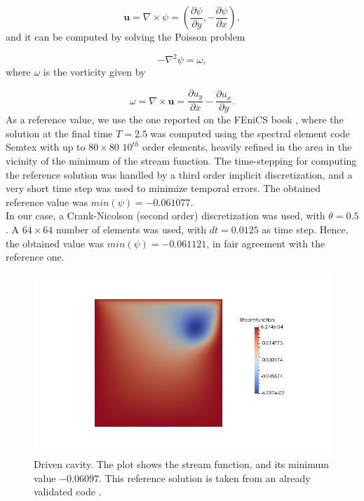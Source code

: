 \documentclass[a4paper,11pt,oneside]{book}
\begin{document}
\[
\mathbf{u} = \nabla \times \psi = (\frac{\partial \psi}{\partial y} , - \frac{\partial \psi }{\partial x}),
\]
and it can be computed by solving the Poisson problem

\[
- \nabla^2 \psi = \omega,
\]
where $\omega$ is the vorticity given by

\[
\omega = \nabla \times \mathbf{u} = \frac{\partial u_y}{\partial x} - \frac{\partial u_x}{\partial y}.
\]
As a reference value, we use the one reported on the FEniCS book \cite{logg}, where the solution at the final time $T = 2.5$ was computed using the spectral element code Semtex with up to $80 \times 80$ $10^{th}$ order elements, heavily refined in the area in the vicinity of the minimum of the stream function. The time-stepping for computing the reference solution was handled by a third order implicit discretization, and a very short time step was used to minimize temporal errors.  The obtained reference value was $min(\psi) = -0.061 077$. \\
In our case, a Crank-Nicolson (second order) discretization was used, with $\theta = 0.5$. A $64 \times 64$ number of elements was used, with $dt = 0.0125$ as time step. Hence, the obtained value was $min(\psi) = -0.061 121$, in fair agreement with the reference one. \\

\newpage

\begin{figure}[h!]
\centering
\includegraphics[width=\textwidth]{images/oyvind.png}
\vspace{-1cm}
\caption{Driven cavity. The plot shows the stream function, and its minimum value $-0.06097$. This reference solution is taken from an already validated code \cite{mortensen}.}
\end{figure}
\end{document}
